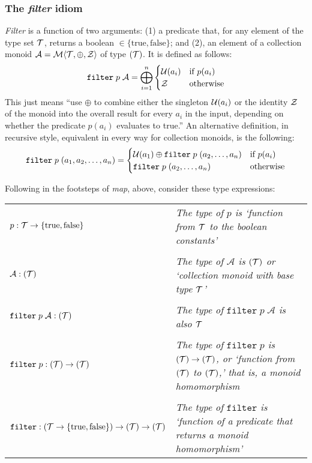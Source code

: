 \subsubsection{\color{red}The \emph{filter} idiom}


\emph{Filter} is a function of two arguments: (1) a predicate that, for any element of the type set $\mathcal{T}$, returns a boolean $\in\{\text{true},\text{false}\}$; and (2), an element of a collection monoid $\mathcal{A}=\mathcal{M}\langle{\mathcal{T}},{\oplus},{\mathcal{Z}}\rangle$ of type $(\mathcal{T})$. It is defined as follows:
  $$\mathtt{filter}\;p\;\mathcal{A}=\bigoplus^n_{i=1}
    \begin{cases}
       \mathcal{U}(a_i) & \text{if $p(a_i)$} \\
       \mathcal{Z} & \text{otherwise}
    \end{cases}$$
This just means ``use $\oplus$ to combine either the singleton $\mathcal{U}(a_i)$ or the identity $\mathcal{Z}$ of the monoid into the overall result for every $a_i$ in the input, depending on whether the predicate $p(a_i)$ evaluates to true.'' An alternative definition, in recursive style, equivalent in every way for collection monoids, is the following:
  $$\mathtt{filter}\;p\;(a_1,a_2,\ldots,a_n) =
  \begin{cases}
    \mathcal{U}(a_1)\oplus\mathtt{filter}\;p\;(a_2,\ldots,a_n) & \text{if $p(a_i)$} \\
    \mathtt{filter}\;p\;(a_2,\ldots,a_n) & \text{otherwise}
  \end{cases}$$

Following in the footsteps of \emph{map}, above, consider these type expressions:
\begin{center}
\begin{tabular}{ll}
  $p:\mathcal{T}\rightarrow\{\text{true},\text{false}\}$
    & \parbox{2.85in}
      {\footnotesize\emph{The type of $p$ is `function from
      $\mathcal{T}$ to the boolean constants'}}\\
  {}&{}\\
  $\mathcal{A}:(\mathcal{T})$
    & \parbox{2.85in}
      {\footnotesize\emph{The type of $\mathcal{A}$ is $(\mathcal{T})$ or
      `collection monoid with base type $\mathcal{T}$'}}\\
  {}&{}\\
  $\mathtt{filter}\;p\;\mathcal{A}:(\mathcal{T})$
    & \parbox{2.85in}
      {\footnotesize\emph{The type of $\mathtt{filter}\;p\;\mathcal{A}$
      is also $\mathcal{T}$}}\\
  {}&{}\\
  $\mathtt{filter}\;p:(\mathcal{T})\rightarrow(\mathcal{T})$
    & \parbox{2.85in}
      {\footnotesize\emph{The type of $\mathtt{filter}\;p$ is
      $(\mathcal{T})\rightarrow(\mathcal{T})$,
      or `function from $(\mathcal{T})$ to $(\mathcal{T})$,' that is, a monoid homomorphism}}\\
  {}&{}\\
  $\mathtt{filter}:(\mathcal{T}\rightarrow\{\text{true},\text{false}\})
    \rightarrow(\mathcal{T})\rightarrow(\mathcal{T})$
    & \parbox{2.85in}
      {\footnotesize\emph{The type of $\mathtt{filter}$ is `function
      of a predicate that returns a monoid homomorphism'}}\\
\end{tabular}
\end{center}


